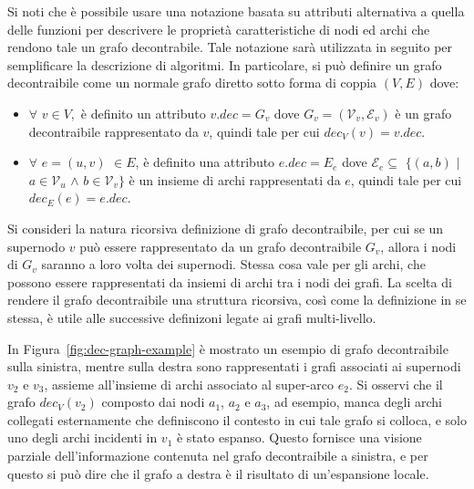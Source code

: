     Si noti che \`e possibile usare una notazione basata su attributi alternativa a quella delle funzioni per
    descrivere le propriet\`a caratteristiche di nodi ed archi che rendono tale un grafo decontrabile.
    Tale notazione sar\`a utilizzata in seguito per semplificare la descrizione di algoritmi. \newline
    In particolare, si pu\`o definire un grafo decontraibile come un normale grafo diretto sotto forma di coppia
    $(V, E)$ dove:
    \begin{itemize}[noitemsep, topsep=0pt, left=0pt, labelsep=5pt]
        \item $\forall$ $v \in V,$ \`e definito un attributo $v.dec = G_v$ dove $G_v = (\mathcal{V}_v, \mathcal{E}_v)$ \`e un grafo decontraibile
            rappresentato da $v$, quindi tale per cui $dec_V(v) = v.dec$.
        \item $\forall$ $e=(u, v)$  $\in E$, \`e definito una attributo $e.dec = E_e$ dove
            $\mathcal{E}_e \subseteq$ $\{(a, b)$ $\mid$ $a \in \mathcal{V}_u$ $\wedge$ $b \in \mathcal{V}_v\}$ \`e un insieme di archi
            rappresentati da $e$, quindi tale per cui $dec_E(e) = e.dec$.
    \end{itemize}

    Si consideri la natura ricorsiva definizione di grafo decontraibile, per cui se un supernodo $v$ pu\`o essere
    rappresentato da un grafo decontraibile $G_v$, allora i nodi di $G_v$ saranno a loro volta dei supernodi.
    Stessa cosa vale per gli archi, che possono essere rappresentati da insiemi di archi tra i nodi dei grafi.
    La scelta di rendere il grafo decontraibile una struttura ricorsiva, cos\`{i} come la definizione in se stessa,
    \`e utile alle successive definizoni legate ai grafi multi-livello. \newline

    In Figura~\ref{fig:dec-graph-example} \`e mostrato un esempio di grafo decontraibile sulla sinistra, mentre sulla
    destra sono rappresentati i grafi associati ai supernodi $v_2$ e $v_3$, assieme all'insieme di archi associato
    al super-arco $e_2$.
    Si osservi che il grafo $dec_V(v_2)$ composto dai nodi $a_1$, $a_2$ e $a_3$, ad esempio, manca degli archi collegati
    esternamente che definiscono il contesto in cui tale grafo si colloca, e solo uno degli archi incidenti
    in $v_1$ \`e stato espanso.
    Questo fornisce una visione parziale dell'informazione contenuta nel grafo decontraibile a sinistra,
    e per questo si pu\`o dire che il grafo a destra \`e il risultato di un'espansione locale.

